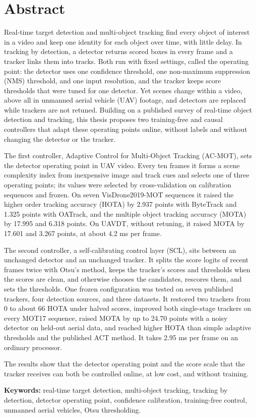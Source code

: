 \chapter*{Abstract}

Real-time target detection and multi-object tracking find every object of interest in a video and keep one identity for each object over time, with little delay. In tracking by detection, a detector returns scored boxes in every frame and a tracker links them into tracks. Both run with fixed settings, called the operating point: the detector uses one confidence threshold, one non-maximum suppression (NMS) threshold, and one input resolution, and the tracker keeps score thresholds that were tuned for one detector. Yet scenes change within a video, above all in unmanned aerial vehicle (UAV) footage, and detectors are replaced while trackers are not retuned. Building on a published survey of real-time object detection and tracking, this thesis proposes two training-free and causal controllers that adapt these operating points online, without labels and without changing the detector or the tracker.

The first controller, Adaptive Control for Multi-Object Tracking (AC-MOT), sets the detector operating point in UAV video. Every ten frames it forms a scene complexity index from inexpensive image and track cues and selects one of three operating points; its values were selected by cross-validation on calibration sequences and frozen. On seven VisDrone2019-MOT sequences it raised the higher order tracking accuracy (HOTA) by 2.937 points with ByteTrack and 1.325 points with OATrack, and the multiple object tracking accuracy (MOTA) by 17.995 and 6.318 points. On UAVDT, without retuning, it raised MOTA by 17.601 and 3.267 points, at about 4.2 ms per frame.

The second controller, a self-calibrating control layer (SCL), sits between an unchanged detector and an unchanged tracker. It splits the score logits of recent frames twice with Otsu's method, keeps the tracker's scores and thresholds when the scores are clean, and otherwise chooses the candidates, rescores them, and sets the thresholds. One frozen configuration was tested on seven published trackers, four detection sources, and three datasets. It restored two trackers from 0 to about 66 HOTA under halved scores, improved both single-stage trackers on every MOT17 sequence, raised MOTA by up to 24.70 points with a noisy detector on held-out aerial data, and reached higher HOTA than simple adaptive thresholds and the published ACT method. It takes 2.95 ms per frame on an ordinary processor.

The results show that the detector operating point and the score scale that the tracker receives can both be controlled online, at low cost, and without training.

\vspace{0.5cm}
\noindent\textbf{Keywords:} real-time target detection, multi-object tracking, tracking by detection, detector operating point, confidence calibration, training-free control, unmanned aerial vehicles, Otsu thresholding.
